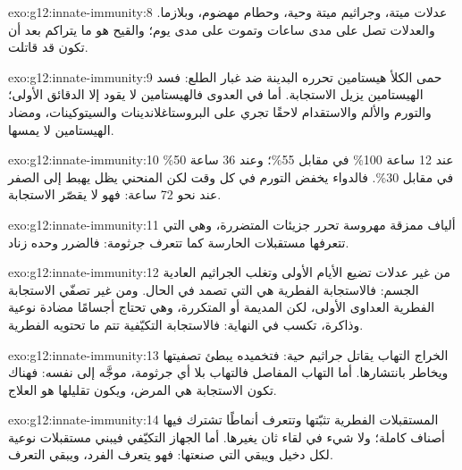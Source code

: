 \begin{solution}{exo:g12:innate-immunity:8}
عدلات ميتة، وجراثيم ميتة وحية، وحطام مهضوم، وبلازما. والعدلات تصل على
مدى ساعات وتموت على مدى يوم؛ والقيح هو ما يتراكم بعد أن تكون قد قاتلت.
\end{solution}

\begin{solution}{exo:g12:innate-immunity:9}
حمى الكلأ هيستامين تحرره  البدينة ضد غبار الطلع: فسد الهيستامين
يزيل الاستجابة. أما في العدوى فالهيستامين لا يقود إلا الدقائق الأولى؛
والتورم والألم والاستقدام لاحقًا تجري على البروستاغلاندينات
والسيتوكينات، ومضاد الهيستامين لا يمسها.
\end{solution}

\begin{solution}{exo:g12:innate-immunity:10}
عند 12 ساعة 100\% في مقابل 55\%؛ وعند 36 ساعة 50\% في مقابل 30\%.
فالدواء يخفض التورم في كل وقت لكن المنحني يظل يهبط إلى الصفر عند نحو
72 ساعة: فهو لا يقصّر الاستجابة.
\end{solution}

\begin{solution}{exo:g12:innate-immunity:11}
ألياف  ممزقة  مهروسة تحرر جزيئات  المتضررة، وهي التي
تتعرفها مستقبلات  الحارسة كما تتعرف جرثومة: فالضرر وحده زناد.
\end{solution}

\begin{solution}{exo:g12:innate-immunity:12}
من غير عدلات تضيع الأيام الأولى وتغلب الجراثيم العادية الجسم: فالاستجابة
الفطرية هي التي تصمد في الحال. ومن غير  تصفّي الاستجابة
الفطرية العداوى الأولى، لكن المديمة أو المتكررة، وهي تحتاج أجسامًا مضادة
نوعية وذاكرة، تكسب في النهاية: فالاستجابة التكيّفية تتم ما تحتويه
الفطرية.
\end{solution}

\begin{solution}{exo:g12:innate-immunity:13}
الخراج التهاب يقاتل جراثيم حية: فتخميده يبطئ تصفيتها ويخاطر بانتشارها.
أما التهاب المفاصل فالتهاب بلا أي جرثومة، موجَّه إلى  نفسه: فهناك
تكون الاستجابة هي المرض، ويكون تقليلها هو العلاج.
\end{solution}

\begin{solution}{exo:g12:innate-immunity:14}
المستقبلات الفطرية تثبّتها  وتتعرف أنماطًا تشترك فيها أصناف
كاملة؛ ولا شيء في لقاء ثان يغيرها. أما الجهاز التكيّفي فيبني مستقبلات
نوعية لكل دخيل ويبقي  التي صنعتها: فهو يتعرف الفرد، ويبقي
التعرف.
\end{solution}

